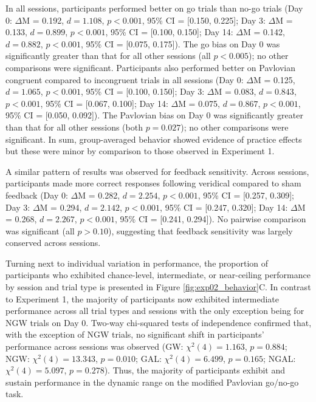 \documentclass[a4paper,12pt]{article}
\begin{document}
\begin{refsection}[main]
In all sessions, participants performed better on go trials than no-go trials (Day 0: $\Delta$M = 0.192, $d = 1.108$, $p < 0.001$, 95\% CI = [0.150, 0.225]; Day 3: $\Delta$M = 0.133, $d = 0.899$, $p < 0.001$, 95\% CI = [0.100, 0.150]; Day 14: $\Delta$M = 0.142, $d = 0.882$, $p < 0.001$, 95\% CI = [0.075, 0.175]). The go bias on Day 0 was significantly greater than that for all other sessions (all $p < 0.005$); no other comparisons were significant. Participants also performed better on Pavlovian congruent compared to incongruent trials in all sessions (Day 0: $\Delta$M = 0.125, $d = 1.065$, $p < 0.001$, 95\% CI = [0.100, 0.150]; Day 3: $\Delta$M = 0.083, $d = 0.843$, $p < 0.001$, 95\% CI = [0.067, 0.100]; Day 14: $\Delta$M = 0.075, $d = 0.867$, $p < 0.001$, 95\% CI = [0.050, 0.092]). The Pavlovian bias on Day 0 was significantly greater than that for all other sessions (both $p = 0.027$); no other comparisons were significant. In sum, group-averaged behavior showed evidence of practice effects but these were minor by comparison to those observed in Experiment 1. 

A similar pattern of results was observed for feedback sensitivity. Across sessions, participants made more correct responses following veridical compared to sham feedback (Day 0: $\Delta$M = 0.282, $d = 2.254$, $p < 0.001$, 95\% CI = [0.257, 0.309]; Day 3: $\Delta$M = 0.294, $d = 2.142$, $p < 0.001$, 95\% CI = [0.247, 0.320]; Day 14: $\Delta$M = 0.268, $d = 2.267$, $p < 0.001$, 95\% CI = [0.241, 0.294]). No pairwise comparison was significant (all $p > 0.10$), suggesting that feedback sensitivity was largely conserved across sessions.

Turning next to individual variation in performance, the proportion of participants who exhibited chance-level, intermediate, or near-ceiling performance by session and trial type is presented in Figure \ref{fig:exp02_behavior}C. In contrast to Experiment 1, the majority of participants now exhibited intermediate performance across all trial types and sessions with the only exception being for NGW trials on Day 0. Two-way chi-squared tests of independence confirmed that, with the exception of NGW trials, no significant shift in participants' performance across sessions was observed (GW: $\chi^2 (4) = 1.163$, $p = 0.884$; NGW: $\chi^2 (4) = 13.343$, $p = 0.010$; GAL: $\chi^2 (4) = 6.499$, $p = 0.165$; NGAL: $\chi^2 (4) = 5.097$, $p = 0.278$). Thus, the majority of participants exhibit and sustain performance in the dynamic range on the modified Pavlovian go/no-go task.


\end{refsection}
\end{document}
